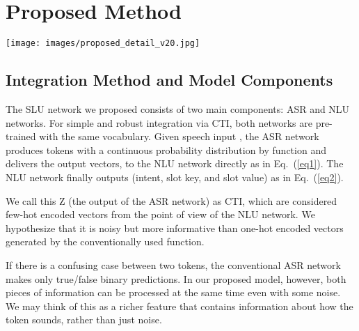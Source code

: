 \documentclass{article}
\newcommand{\interface}{CTI}
\begin{document}
\vspace{-2mm}
\section{Proposed Method}


\begin{figure*}[ht!]
\centering
\texttt{[image: images/proposed\_detail\_v20.jpg]}
\caption{Our proposed model architecture. We integrate the ASR network and the NLU network with \interface. 
We can train the entire network in an end-to-end manner or each component independently.}
\label{fig:propose_network_detail} 
\vspace{-5mm}\end{figure*}



\vspace{-2mm}
\subsection{Integration Method and Model Components}
The SLU network we proposed consists of two main components: ASR and NLU networks.
For simple and robust integration via CTI, both networks are pre-trained with the same vocabulary. 
Given speech input , the ASR network produces tokens with a continuous probability distribution by  function and delivers the output vectors,  to the NLU network directly as in Eq.~(\ref{eq1}).
The NLU network finally outputs (intent, slot key, and slot value) as in Eq.~(\ref{eq2}).

\vspace{-3mm}

\vspace{-4mm}

\vspace{-4mm}

We call this Z (the output of the ASR network) as CTI, which are considered few-hot encoded vectors from the point of view of the NLU network.
We hypothesize that it is noisy but more informative than one-hot encoded vectors generated by the conventionally used  function.

If there is a confusing case between two tokens, the conventional ASR network makes only true/false binary predictions. 
In our proposed model, however, both pieces of information can be processed at the same time even with some noise.
We may think of this as a richer feature that contains information about how the token sounds, rather than just noise.
\end{document}
